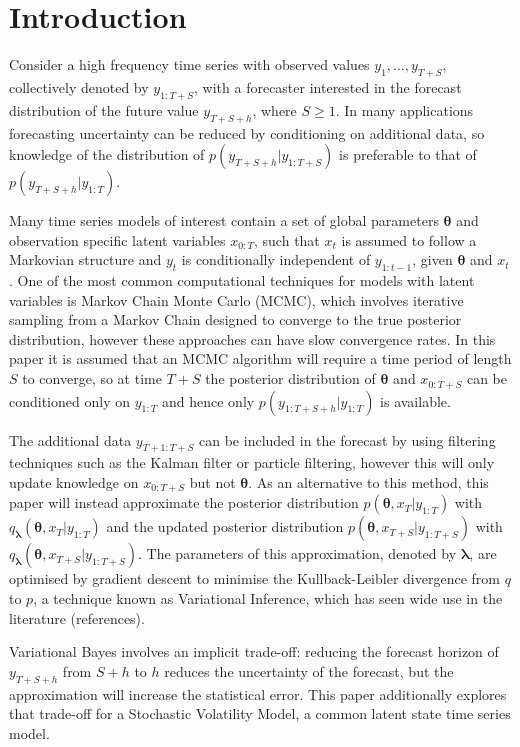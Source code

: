 \documentclass[12pt,a4paper]{article}%
\numberwithin{equation}{section}
\begin{document}
\section{Introduction}

Consider a high frequency time series with observed values $y_{1}, \dots, y_{T+S}$, collectively denoted by $y_{1:T+S}$, with a forecaster interested in the forecast distribution of the future value $y_{T+S+h}$, where $S \geq 1$. In many applications forecasting uncertainty can be reduced by conditioning on additional data, so knowledge of the distribution of $p(y_{T+S+h} | y_{1:T+S})$ is preferable to that of $p(y_{T+S+h} | y_{1:T})$. 

Many time series models of interest contain a set of global parameters $\boldsymbol{\theta}$ and observation specific latent variables $x_{0:T}$, such that $x_t$ is assumed to follow a Markovian structure and $y_t$ is conditionally independent of $y_{1:t-1}$, given $\boldsymbol{\theta}$ and $x_t$. One of the most common computational techniques for models with latent variables is Markov Chain Monte Carlo (MCMC), which involves iterative sampling from a Markov Chain designed to converge to the true posterior distribution, however these approaches can have slow convergence rates. In this paper it is assumed that an MCMC algorithm will require a time period of length $S$ to converge, so at time $T+S$ the posterior distribution of $\boldsymbol{\theta}$  and $x_{0:T+S}$ can be conditioned only on $y_{1:T}$ and hence only $p(y_{1:T+S+h} | y_{1:T})$ is available.

The additional data $y_{T+1:T+S}$ can be included in the forecast by using filtering techniques such as the Kalman filter or particle filtering, however this will only update knowledge on $x_{0:T+S}$ but not $\boldsymbol{\theta}$. As an alternative to this method, this paper will instead approximate the posterior distribution $p(\boldsymbol{\theta}, x_{T} | y_{1:T})$ with $q_{\boldsymbol{\lambda}}(\boldsymbol{\theta}, x_{T} | y_{1:T})$ and the updated posterior distribution $p(\boldsymbol{\theta}, x_{T+S} | y_{1:T+S})$ with $q_{\boldsymbol{\lambda}}(\boldsymbol{\theta}, x_{T+S} | y_{1:T+S})$. The parameters of this approximation, denoted by $\boldsymbol{\lambda}$, are optimised by gradient descent to minimise the Kullback-Leibler divergence from $q$ to $p$, a technique known as Variational Inference, which has seen wide use in the literature (references).

Variational Bayes involves an implicit trade-off: reducing the forecast horizon of $y_{T+S+h}$ from $S+h$ to $h$ reduces the uncertainty of the forecast, but the approximation will increase the statistical error. This paper additionally explores that trade-off for a Stochastic Volatility Model, a common latent state time series model.
\end{document}

